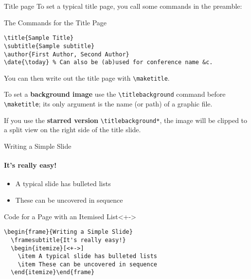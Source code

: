 \begin{frame}[fragile]{Title page}
To set a typical title page, you call some commands in the preamble:
\begin{block}{The Commands for the Title Page}
\begin{verbatim}
\title{Sample Title}
\subtitle{Sample subtitle}
\author{First Author, Second Author}
\date{\today} % Can also be (ab)used for conference name &c.
\end{verbatim}
\end{block}
You can then write out the title page with \verb|\maketitle|.

To set a \textbf{background image} use the \verb|\titlebackground| command 
before \verb|\maketitle|; its only argument is the name (or path) of a graphic 
file.

If you use the \textbf{starred version} \verb|\titlebackground*|, the image 
will be clipped to a split view on the right side of the title slide.

\end{frame}

\begin{frame}[fragile]{Writing a Simple Slide}
\framesubtitle{It's really easy!}
\begin{itemize}[<+->]
\item A typical slide has bulleted lists
\item These can be uncovered in sequence
\end{itemize}
\begin{block}{Code for a Page with an Itemised List}<+->
\begin{verbatim}
\begin{frame}{Writing a Simple Slide}
  \framesubtitle{It's really easy!}
  \begin{itemize}[<+->]
    \item A typical slide has bulleted lists
    \item These can be uncovered in sequence
  \end{itemize}\end{frame}
\end{verbatim}
\end{block}
\end{frame}
